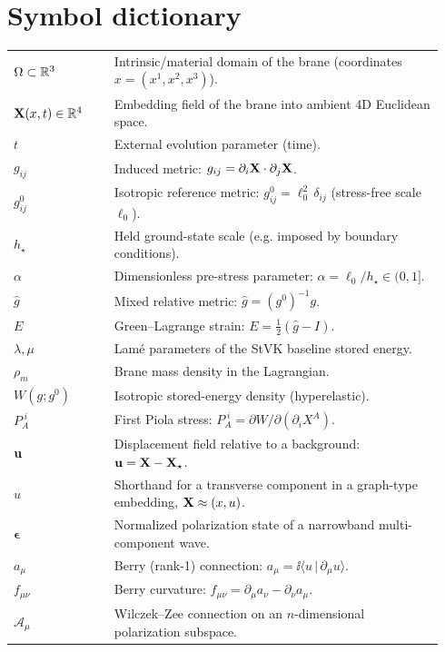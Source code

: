 \section{Symbol dictionary}
\label{app:symbols}

\begin{center}
\begin{tabular}{p{0.22\linewidth} p{0.72\linewidth}}
$\Omega\subset\mathbb{R}^3$ & Intrinsic/material domain of the brane (coordinates $x=(x^1,x^2,x^3)$).\\
$\mathbf{X}(x,t)\in\mathbb{R}^4$ & Embedding field of the brane into ambient 4D Euclidean space.\\
$t$ & External evolution parameter (time).\\
$g_{ij}$ & Induced metric: $g_{ij}=\partial_i\mathbf{X}\cdot\partial_j\mathbf{X}$.\\
$g^0_{ij}$ & Isotropic reference metric: $g^0_{ij}=\ell_0^2\,\delta_{ij}$ (stress-free scale $\ell_0$).\\
$h_\star$ & Held ground-state scale (e.g. imposed by boundary conditions).\\
$\alpha$ & Dimensionless pre-stress parameter: $\alpha=\ell_0/h_\star\in(0,1]$.\\
$\widehat g$ & Mixed relative metric: $\widehat g=(g^0)^{-1}g$.\\
$E$ & Green--Lagrange strain: $E=\tfrac12(\widehat g-I)$.\\
$\lambda,\mu$ & Lam\'e parameters of the StVK baseline stored energy.\\
$\rho_m$ & Brane mass density in the Lagrangian.\\
$W(g;g^0)$ & Isotropic stored-energy density (hyperelastic).\\
$P_A^{\;i}$ & First Piola stress: $P_A^{\;i}=\partial W/\partial(\partial_i X^A)$.\\
$\mathbf{u}$ & Displacement field relative to a background: $\mathbf{u}=\mathbf{X}-\mathbf{X}_\star$.\\
$u$ & Shorthand for a transverse component in a graph-type embedding, $\mathbf{X}\approx(x,u)$.\\
$\bm{\epsilon}$ & Normalized polarization state of a narrowband multi-component wave.\\
$a_\mu$ & Berry (rank-1) connection: $a_\mu=\ii\langle u\,|\,\partial_\mu u\rangle$.\\
$f_{\mu\nu}$ & Berry curvature: $f_{\mu\nu}=\partial_\mu a_\nu-\partial_\nu a_\mu$.\\
$\mathcal{A}_\mu$ & Wilczek--Zee connection on an $n$-dimensional polarization subspace.\\

\end{tabular}
\end{center}
